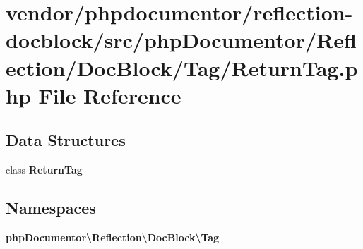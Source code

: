 \section{vendor/phpdocumentor/reflection-\/docblock/src/php\+Documentor/\+Reflection/\+Doc\+Block/\+Tag/\+Return\+Tag.php File Reference}
\label{_return_tag_8php}
\subsection*{Data Structures}
\begin{DoxyCompactItemize}
\item 
class {\bf Return\+Tag}
\end{DoxyCompactItemize}
\subsection*{Namespaces}
\begin{DoxyCompactItemize}
\item 
 {\bf php\+Documentor\textbackslash{}\+Reflection\textbackslash{}\+Doc\+Block\textbackslash{}\+Tag}
\end{DoxyCompactItemize}
